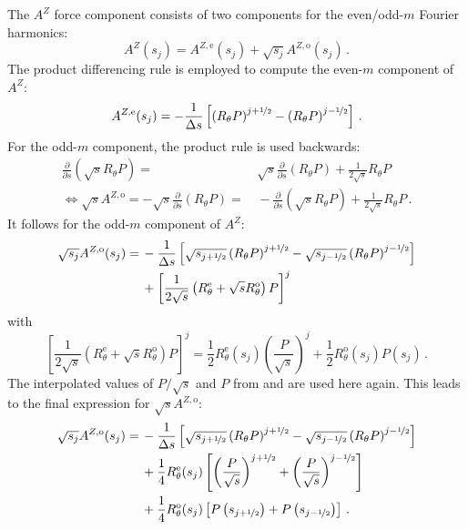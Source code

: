 The $A^Z$ force component consists of two components for the even/odd-$m$ Fourier harmonics:
\begin{equation}
  A^Z(s_j) = A^{Z,\mathrm{e}}(s_j) + \sqrt{s_j} A^{Z,\mathrm{o}} (s_j) \, .
\end{equation}
The product differencing rule is employed to compute the even-$m$ component of $A^Z$:
\begin{equation}
  A^{Z,\mathrm{e}} (s_j) = - \frac{1}{\Delta s} \left[ \left( R_\theta P \right)^{j+\nicefrac{1}{2}} - \left( R_\theta P \right)^{j-\nicefrac{1}{2}} \right] \, .
\end{equation}
For the odd-$m$ component, the product rule is used backwards:
\begin{align}
  \frac{\partial}{\partial s} \left( \sqrt{s} R_\theta P \right) =&\, \sqrt{s} \frac{\partial}{\partial s} \left( R_\theta P \right) + \frac{1}{2 \sqrt{s}} R_\theta P \nonumber \\
  \Leftrightarrow
  \sqrt{s} A^{Z,\mathrm{o}} =
  - \sqrt{s} \frac{\partial}{\partial s} \left( R_\theta P \right) =&\, - \frac{\partial}{\partial s} \left( \sqrt{s} R_\theta P \right) + \frac{1}{2 \sqrt{s}} R_\theta P \, .
\end{align}
It follows for the odd-$m$ component of $A^Z$:
\begin{align}
  \sqrt{s_j} A^{Z,\mathrm{o}} (s_j)
  =&\, - \frac{1}{\Delta s} \left[ \sqrt{s_{j+\nicefrac{1}{2}}} \left( R_\theta P \right)^{j+\nicefrac{1}{2}} - \sqrt{s_{j-\nicefrac{1}{2}}} \left( R_\theta P \right)^{j-\nicefrac{1}{2}} \right] \nonumber \\
  ~&\, + \left[ \frac{1}{2 \sqrt{s}} \left( R_\theta^\mathrm{e} + \sqrt{s} R_\theta^\mathrm{o} \right) P \right]^j
\end{align}
with
\begin{equation}
  \left[ \frac{1}{2 \sqrt{s}} \left( R_\theta^\mathrm{e} + \sqrt{s} R_\theta^\mathrm{o} \right) P \right]^j
  = \frac{1}{2} R_\theta^\mathrm{e}(s_j) \left(\frac{P}{\sqrt{s}}\right)^j + \frac{1}{2} R_\theta^\mathrm{o}(s_j) P(s_j) \, .
\end{equation}
The interpolated values of $P/\sqrt{s}$ and $P$ from  and  are used here again.
This leads to the final expression for $\sqrt{s} A^{Z,\mathrm{o}}$:
\begin{align}
  \sqrt{s_j} A^{Z,\mathrm{o}}(s_j)
  =&\, - \frac{1}{\Delta s} \left[ \sqrt{s_{j+\nicefrac{1}{2}}} \left( R_\theta P \right)^{j+\nicefrac{1}{2}} - \sqrt{s_{j-\nicefrac{1}{2}}} \left( R_\theta P \right)^{j-\nicefrac{1}{2}} \right] \nonumber \\
  ~&\, + \frac{1}{4} R_\theta^\mathrm{e}(s_j) \left[ \left( \frac{P}{\sqrt{s}} \right)^{j+\nicefrac{1}{2}} + \left( \frac{P}{\sqrt{s}} \right)^{j-\nicefrac{1}{2}} \right] \nonumber \\
  ~&\, + \frac{1}{4} R_\theta^\mathrm{o}(s_j) \left[ P \left(s_{j+\nicefrac{1}{2}}\right) + P\left(s_{j-\nicefrac{1}{2}}\right) \right] \, .
\end{align}

